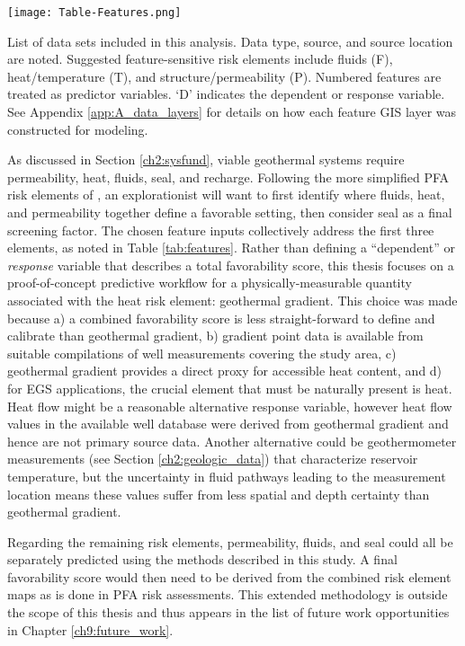 \begin{table}
\centering
\texttt{[image: Table-Features.png]}
\caption[Southwestern New Mexico feature list]{List of data sets included in this analysis. Data type, source, and source location are noted. Suggested feature-sensitive risk elements include fluids (F), heat/temperature (T), and structure/permeability (P). Numbered features are treated as predictor variables. `D' indicates the dependent or response variable. See Appendix \ref{app:A_data_layers} for details on how each feature GIS layer was constructed for modeling.}
\label{tab:features}
\end{table}

As discussed in Section \ref{ch2:sysfund}, viable geothermal systems require permeability, heat, fluids, seal, and recharge. Following the more simplified PFA risk elements of \citet{bielicki_hydrogeolgic_2015}, an explorationist will want to first identify where fluids, heat, and permeability together define a favorable setting, then consider seal as a final screening factor. The chosen feature inputs collectively address the first three elements, as noted in Table \ref{tab:features}. Rather than defining a ``dependent'' or \textit{response} variable that describes a total favorability score, this thesis focuses on a proof-of-concept predictive workflow for a physically-measurable quantity associated with the heat risk element: geothermal gradient. This choice was made because a) a combined favorability score is less straight-forward to define and calibrate than geothermal gradient, b) gradient point data is available from suitable compilations of well measurements covering the study area, c) geothermal gradient provides a direct proxy for accessible heat content, and d) for EGS applications, the crucial element that must be naturally present is heat. Heat flow might be a reasonable alternative response variable, however heat flow values in the available well database were derived from geothermal gradient and hence are not primary source data. Another alternative could be geothermometer measurements (see Section \ref{ch2:geologic_data}) that characterize reservoir temperature, but the uncertainty in fluid pathways leading to the measurement location means these values suffer from less spatial and depth certainty than geothermal gradient.

Regarding the remaining risk elements, permeability, fluids, and seal could all be separately predicted using the methods described in this study. A final favorability score would then need to be derived from the combined risk element maps as is done in PFA risk assessments. This extended methodology is outside the scope of this thesis and thus appears in the list of future work opportunities in Chapter \ref{ch9:future_work}.

